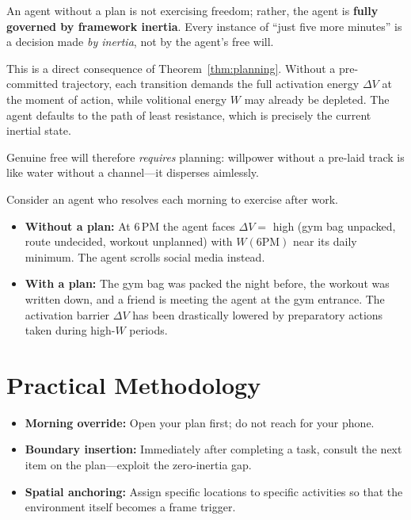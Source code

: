 \begin{corollary}\label{cor:unfree}
An agent without a plan is not exercising freedom; rather, the agent is
\textbf{fully governed by framework inertia}. Every instance of ``just five
more minutes'' is a decision made \emph{by inertia}, not by the agent's free
will.
\end{corollary}

\begin{discussion}
This is a direct consequence of Theorem~\ref{thm:planning}. Without a
pre-committed trajectory, each transition demands the full activation energy
$\Delta V$ at the moment of action, while volitional energy $W$ may already be
depleted. The agent defaults to the path of least resistance, which is
precisely the current inertial state.

Genuine free will therefore \emph{requires} planning: willpower without a
pre-laid track is like water without a channel---it disperses aimlessly.
\end{discussion}

\begin{examplebox}
Consider an agent who resolves each morning to exercise after work.
\begin{itemize}[nosep]
  \item \textbf{Without a plan:} At 6\,PM the agent faces $\Delta V =$ high
        (gym bag unpacked, route undecided, workout unplanned) with
        $W(6\text{PM})$ near its daily minimum. The agent scrolls social media
        instead.
  \item \textbf{With a plan:} The gym bag was packed the night before, the
        workout was written down, and a friend is meeting the agent at the
        gym entrance. The activation barrier $\Delta V$ has been drastically
        lowered by preparatory actions taken during high-$W$ periods.
\end{itemize}
\end{examplebox}

\section{Practical Methodology}\label{sec:practice}

\begin{methodbox}[title={Method 1: Exploit Decision Windows}]
\begin{itemize}[nosep]
  \item \textbf{Morning override:} Open your plan first; do not reach for
        your phone.
  \item \textbf{Boundary insertion:} Immediately after completing a task,
        consult the next item on the plan---exploit the zero-inertia gap.
  \item \textbf{Spatial anchoring:} Assign specific locations to specific
        activities so that the environment itself becomes a frame trigger.
\end{itemize}
\end{methodbox}

